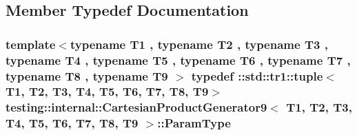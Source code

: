 \subsection{Member Typedef Documentation}
\hypertarget{classtesting_1_1internal_1_1_cartesian_product_generator9_a333de873be0c11965024ad94d5e958d9}{
\subsubsection[{Param\-Type}]{\setlength{\rightskip}{0pt plus 5cm}template$<$typename T1 , typename T2 , typename T3 , typename T4 , typename T5 , typename T6 , typename T7 , typename T8 , typename T9 $>$ typedef \-::{\bf std\-::tr1\-::tuple}$<$T1, T2, T3, T4, T5, T6, T7, T8, T9$>$ {\bf testing\-::internal\-::\-Cartesian\-Product\-Generator9}$<$ T1, T2, T3, T4, T5, T6, T7, T8, T9 $>$\-::{\bf Param\-Type}}}\label{classtesting_1_1internal_1_1_cartesian_product_generator9_a333de873be0c11965024ad94d5e958d9}



